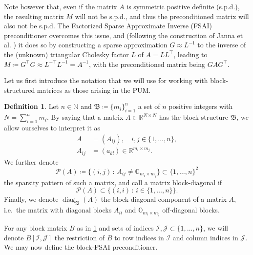 \documentclass[a4paper]{article}
\DeclareMathOperator{\diag}{diag}
\theoremstyle{plain}
\theoremstyle{definition}
\newtheorem{definition}{Definition}[section]
\theoremstyle{remark}
\begin{document}
Note however that, even if the matrix \(A\) is symmetric positive definite (s.p.d.), the resulting matrix \(M\) will not be s.p.d., and thus the preconditioned matrix will also not be s.p.d. The Factorized Sparse Approximate Inverse (FSAI) preconditioner overcomes this issue, and (following the construction of Janna et al. \cite{Janna2015}) it does so by constructing a sparse approximation \(G \approx L^{-1}\) to the inverse of the (unknown) triangular Cholesky factor \(L\) of \(A = L L^{\top}\), leading to \(M \coloneqq G^{\top} G \approx L^{-\top} L^{-1} = A^{-1}\), with the preconditioned matrix being \(G A G^{\top}\).

Let us first introduce the notation that we will use for working with block-structured matrices as those arising in the PUM.

\begin{definition}\label{def:block_structure}
	Let \(n \in \mathbb{N}\) and \(\mathfrak{B} \coloneqq \{m_i\}_{i=1}^n\) a set of \(n\) positive integers with \(N = \sum_{i=1}^n m_i\). By saying that a matrix \(A\in \mathbb{R}^{N \times N}\) has the block structure \(\mathfrak{B}\), we allow ourselves to interpret it as
	\begin{align*}
		A &= (A_{ij}), \quad i,j \in \{1,\dots,n\}, \\
		A_{ij} &= (a_{kl}) \in \mathbb{R}^{m_i\times m_j}.
	\end{align*}
	We further denote
	\begin{equation*}
		\mathcal{P}(A) \coloneqq \{(i, j)\, \colon \, A_{ij} \neq \mathbb{O}_{m_i \times m_j}\} \subset \{1,\dots,n\}^2
	\end{equation*}
	the sparsity pattern of such a matrix, and call a matrix block-diagonal if
	\begin{equation*}
		\mathcal{P}(A) \subset \{(i, i)\,\colon\, i \in \{1,\dots,n\}\}.
	\end{equation*}	
	Finally, we denote \(\diag_{\mathfrak{B}}(A)\) the block-diagonal component of a matrix \(A\), i.e.\ the matrix with diagonal blocks \(A_{ii}\) and \(\mathbb{O}_{m_i \times m_j}\) off-diagonal blocks.
\end{definition}

For any block matrix \(B\) as in \cref{def:block_structure} and sets of indices \(\mathcal{I},\mathcal{J}\subset \{1,\dots,n\}\), we will denote \(B[\mathcal{I},\mathcal{J}]\) the restriction of \(B\) to row indices in \(\mathcal{I}\) and column indices in \(\mathcal{J}\). We may now define the block-FSAI preconditioner.
\end{document}
